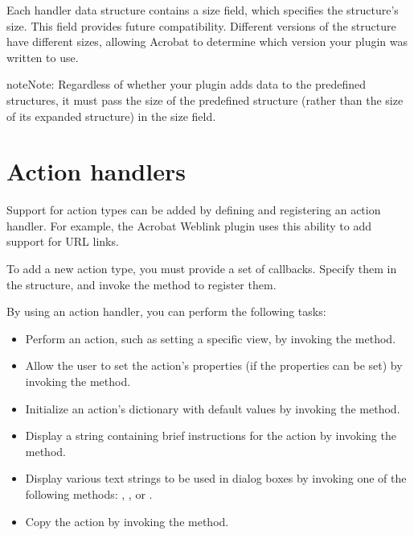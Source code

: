 \documentclass[letterpaper,12pt,english,openany,oneside]{sphinxmanual}
\begin{document}
Each handler data structure contains a size field, which specifies the structure’s size. This field provides future compatibility. Different versions of the structure have different sizes, allowing Acrobat to determine which version your plugin was written to use.

\begin{sphinxadmonition}{note}{Note:}
Regardless of whether your plugin adds data to the predefined structures, it must pass the size of the predefined structure (rather than the size of its expanded structure) in the size field.
\end{sphinxadmonition}


\section{Action handlers}
\label{\detokenize{Plugins_Handlers:action-handlers}}
Support for action types can be added by defining and registering an action handler. For example, the Acrobat Weblink plugin uses this ability to add support for URL links.

To add a new action type, you must provide a set of callbacks. Specify them in the  structure, and invoke the  method to register them.

By using an action handler, you can perform the following tasks:
\begin{itemize}
\item {} 
Perform an action, such as setting a specific view, by invoking the  method.

\item {} 
Allow the user to set the action’s properties (if the properties can be set) by invoking the  method.

\item {} 
Initialize an action’s dictionary with default values by invoking the  method.

\item {} 
Display a string containing brief instructions for the action by invoking the  method.

\item {} 
Display various text strings to be used in dialog boxes by invoking one of the following methods: , , or .

\item {} 
Copy the action by invoking the  method.

\end{itemize}
\end{document}
